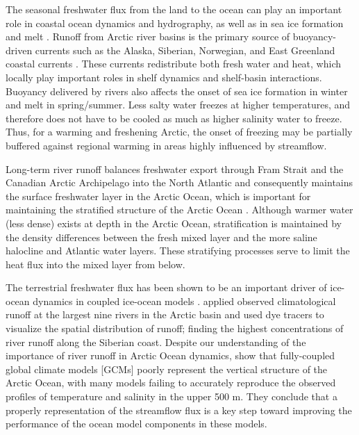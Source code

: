 \documentclass[jgrga, draft]{agutex}
\begin{document}
\begin{article}
The seasonal freshwater flux from the land to the ocean can play an important role in coastal ocean dynamics and hydrography, as well as in sea ice formation and melt \citep{Rabe_2011,Fichot_2013}.
Runoff from Arctic river basins is the primary source of buoyancy-driven currents such as the Alaska, Siberian, Norwegian, and East Greenland coastal currents \citep[e.g.][]{Morison_2000,Boyd_2002,McGeehan_2012}.
These currents redistribute both fresh water and heat, which locally play important roles in shelf dynamics and shelf-basin interactions.
Buoyancy delivered by rivers also affects the onset of sea ice formation in winter and melt in spring/summer.
Less salty water freezes at higher temperatures, and therefore does not have to be cooled as much as higher salinity water to freeze.
Thus, for a warming and freshening Arctic, the onset of freezing may be partially buffered against regional warming in areas highly influenced by streamflow.

Long-term river runoff balances freshwater export through Fram Strait and the Canadian Arctic Archipelago into the North Atlantic and consequently maintains the surface freshwater layer in the Arctic Ocean, which is important for maintaining the stratified structure of the Arctic Ocean \citep{Nummelin_2015}.
Although warmer water (less dense) exists at depth in the Arctic Ocean, stratification is maintained by the density differences between the fresh mixed layer and the more saline halocline and Atlantic water layers.
These stratifying processes serve to limit the heat flux into the mixed layer from below.

The terrestrial freshwater flux has been shown to be an important driver of ice-ocean dynamics in coupled ice-ocean models \citep[e.g.][]{Lique_2015}.
\citet{Newton_2008} applied observed climatological runoff at the largest nine rivers in the Arctic basin and used dye tracers  to visualize the spatial distribution of runoff; finding the highest concentrations of river runoff along the Siberian coast.
Despite our understanding of the importance of river runoff in Arctic Ocean dynamics, \citet{Nummelin_2015} show that fully-coupled global climate models [GCMs] poorly represent the vertical structure of the Arctic Ocean, with many models failing to accurately reproduce the observed profiles of temperature and salinity in the upper 500 m.
They conclude that a properly representation of the streamflow flux is a key step toward improving the performance of the ocean model components in these models.


\end{article}
\end{document}
